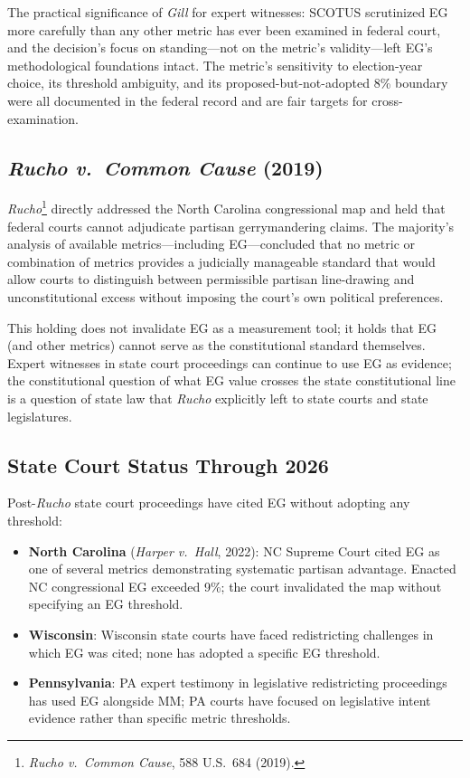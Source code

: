 The practical significance of \textit{Gill} for expert witnesses: SCOTUS scrutinized
EG more carefully than any other metric has ever been examined in federal court,
and the decision's focus on standing---not on the metric's validity---left EG's
methodological foundations intact. The metric's sensitivity to election-year choice,
its threshold ambiguity, and its proposed-but-not-adopted 8\% boundary were all
documented in the federal record and are fair targets for cross-examination.

\subsection{\textit{Rucho v.\ Common Cause} (2019)}

\textit{Rucho}\footnote{\textit{Rucho v.\ Common Cause}, 588 U.S.\ 684 (2019).}
directly addressed the North Carolina congressional map and held that federal courts
cannot adjudicate partisan gerrymandering claims. The majority's analysis of
available metrics---including EG---concluded that no metric or combination of
metrics provides a judicially manageable standard that would allow courts to
distinguish between permissible partisan line-drawing and unconstitutional excess
without imposing the court's own political preferences.

This holding does not invalidate EG as a measurement tool; it holds that EG
(and other metrics) cannot serve as the constitutional standard themselves.
Expert witnesses in state court proceedings can continue to use EG as evidence;
the constitutional question of what EG value crosses the state constitutional
line is a question of state law that \textit{Rucho} explicitly left to state
courts and state legislatures.

\subsection{State Court Status Through 2026}

Post-\textit{Rucho} state court proceedings have cited EG without adopting any
threshold:

\begin{itemize}
\item \textbf{North Carolina} (\textit{Harper v.\ Hall}, 2022): NC Supreme Court
  cited EG as one of several metrics demonstrating systematic partisan advantage.
  Enacted NC congressional EG exceeded 9\%; the court invalidated the map without
  specifying an EG threshold.
\item \textbf{Wisconsin}: Wisconsin state courts have faced redistricting challenges
  in which EG was cited; none has adopted a specific EG threshold.
\item \textbf{Pennsylvania}: PA expert testimony in legislative redistricting
  proceedings has used EG alongside MM; PA courts have focused on legislative
  intent evidence rather than specific metric thresholds.
\end{itemize}

